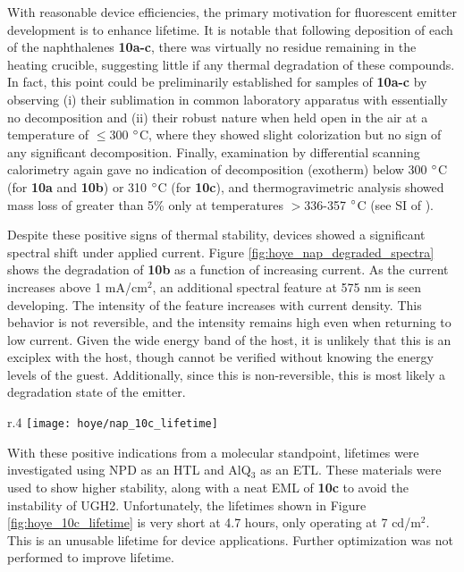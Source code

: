 \documentclass[../thesis.tex]{subfiles}
\begin{document}
With reasonable device efficiencies, the primary motivation for fluorescent emitter development is to enhance lifetime.
It is notable that following deposition of each of the naphthalenes \textbf{10a-c}, there was virtually no residue remaining in the heating crucible, suggesting little if any thermal degradation of these compounds. 
In fact, this point could be preliminarily established for samples of \textbf{10a-c} by observing (i) their sublimation in common laboratory apparatus with essentially no decomposition and (ii) their robust nature when held open in the air at a temperature of $\le$300 $\degree$C, where they showed slight colorization but no sign of any significant decomposition. 
Finally, examination by differential scanning calorimetry again gave no indication of decomposition (exotherm) below 300 $\degree$C (for \textbf{10a} and \textbf{10b}) or 310 $\degree$C (for \textbf{10c}), and thermogravimetric analysis showed mass loss of greater than 5\% only at temperatures $>$336-357 $\degree$C (see SI of \textcite{Xu2016}). 

Despite these positive signs of thermal stability, devices showed a significant spectral shift under applied current.
Figure \ref{fig:hoye_nap_degraded_spectra} shows the degradation of \textbf{10b} as a function of increasing current.
As the current increases above 1 mA/cm$^2$, an additional spectral feature at 575 nm is seen developing.  
The intensity of the feature increases with current density.
This behavior is not reversible, and the intensity remains high even when returning to low current.  
Given the wide energy band of the host, it is unlikely that this is an exciplex with the host, though cannot be verified without knowing the energy levels of the guest.
Additionally, since this is non-reversible, this is most likely a degradation state of the emitter.

\begin{wrapfigure}{r}{.4\textwidth}
\centering
\texttt{[image: hoye/nap\_10c\_lifetime]}
\caption{Lifetime of molecule \textbf{10c}.}
\label{fig:hoye_10c_lifetime}
\end{wrapfigure}

With these positive indications from a molecular standpoint, lifetimes were investigated using NPD as an HTL and AlQ$_3$ as an ETL.
These materials were used to show higher stability, along with a neat EML of \textbf{10c} to avoid the instability of UGH2.
Unfortunately, the lifetimes shown in Figure \ref{fig:hoye_10c_lifetime} is very short at 4.7 hours, only operating at 7 cd/m$^2$.
This is an unusable lifetime for device applications.
Further optimization was not performed to improve lifetime.
\end{document}
